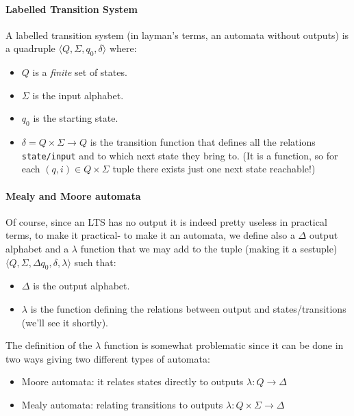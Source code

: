 \documentclass{scrartcl}
\begin{document}
    \paragraph{Labelled Transition System} A labelled transition system (in layman's terms, an automata without outputs) is a quadruple $\langle Q, \Sigma, q_0, \delta\rangle$ where:
    \begin{itemize}
        \item $Q$ is a \emph{finite} set of states.
        \item $\Sigma$ is the input alphabet.
        \item $q_0$ is the starting state.
        \item $\delta= Q\times\Sigma\to Q$ is the transition function that defines all the relations \texttt{state/input} and to which next state they bring to. (It is a function, so for each $(q,i)\in Q\times\Sigma$ tuple there exists just one next state reachable!)
    \end{itemize}
    \paragraph{Mealy and Moore automata} Of course, since an LTS has no output it is indeed pretty useless in practical terms, to make it practical- to make it an automata, we define also a $\Delta$ output alphabet and a $\lambda$ function that we may add to the tuple (making it a sestuple) $\langle Q, \Sigma,\Delta q_0, \delta,\lambda\rangle$ such that:
    \begin{itemize}
        \item $\Delta$ is the output alphabet.
        \item $\lambda$ is the function defining the relations between output and states/transitions (we'll see it shortly).
    \end{itemize}
    The definition of the $\lambda$ function is somewhat problematic since it can be done in two ways giving two different types of automata:
    \begin{itemize}
        \item Moore automata: it relates states directly to outputs $\lambda:Q\to\Delta$
        \item Mealy automata: relating transitions to outputs $\lambda:Q\times\Sigma\to\Delta$
    \end{itemize}
\end{document}
